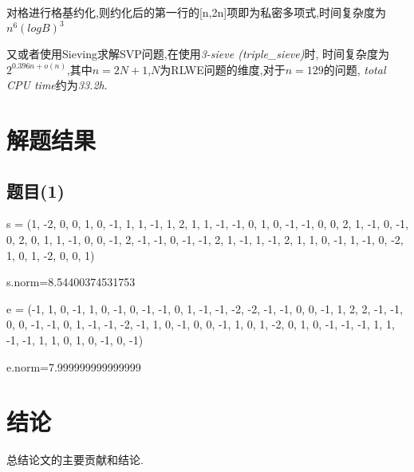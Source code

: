 \documentclass[12pt,a4paper]{article}
\numberwithin{equation}{section}
\begin{document}
对格进行格基约化,则约化后的第一行的[n,2n]项即为私密多项式,时间复杂度为$n^6 (logB)^3$\cite{adleman1981}

又或者使用Sieving求解SVP问题,在使用\textit{3-sieve (triple\_sieve)}时,
时间复杂度为$2^{0.396n+o(n)}$,其中$n=2N+1$,$N$为RLWE问题的维度,对于$n=129$的问题,
\textit{total CPU time}约为\textit{33.2h}\cite{cryptoeprint:2019/089}.


\section{解题结果}

\subsection{题目(1)}


s = (1, -2, 0, 0, 1, 0, -1, 1, 1, -1, 1, 2, 1, 1,
-1, -1, 0, 1, 0, -1, -1, 0, 0, 2, 1, -1, 0, -1, 0, 2, 0, 1,
1, -1, 0, 0, -1, 2, -1, -1, 0, -1, -1, 2, 1, -1, 1, -1, 2, 1, 1, 0,
-1, 1, -1, 0, -2, 1, 0, 1, -2, 0, 0, 1)

s.norm=8.54400374531753

\hspace*{\fill}

e = (-1, 1, 0, -1, 1, 0, -1, 0, -1, -1, 0, 1, -1, -1, -2, -2, -1, -1, 0, 0, -1, 1, 2, 2, -1,
-1, 0, 0, -1, -1, 0, 1, -1, -1, -2, -1, 1, 0, -1, 0, 0, -1, 1, 0, 1, -2, 0, 1, 0, -1, -1,
-1, 1, 1, -1, -1, 1, 1, 0, 1, 0, -1, 0, -1)

e.norm=7.999999999999999

\section{结论}

总结论文的主要贡献和结论.

\vspace{1em}

{\songti\fontsize{12pt}{18pt}\selectfont
	
}
%
\end{document}
